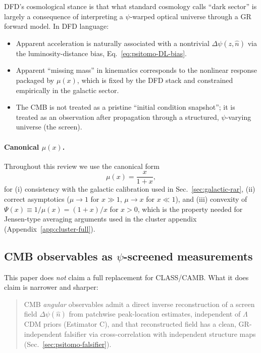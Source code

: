 DFD's cosmological stance is that what standard cosmology calls ``dark sector'' is largely a consequence of interpreting a $\psi$-warped optical universe through a GR forward model. In DFD language:
\begin{itemize}
\item Apparent acceleration is naturally associated with a nontrivial $\Delta\psi(z,\hat n)$ via the luminosity-distance bias, Eq.~\eqref{eq:psitomo-DL-bias}.
\item Apparent ``missing mass'' in kinematics corresponds to the nonlinear response packaged by $\mu(x)$, which is fixed by the DFD stack and constrained empirically in the galactic sector.
\item The CMB is not treated as a pristine ``initial condition snapshot''; it is treated as an observation after propagation through a structured, $\psi$-varying universe (the screen).
\end{itemize}

\paragraph{Canonical $\mu(x)$.}
Throughout this review we use the canonical form
\begin{equation}
\mu(x)=\frac{x}{1+x},
\end{equation}
for (i) consistency with the galactic calibration used in Sec.~\ref{sec:galactic-rar}, (ii) correct asymptotics ($\mu\to 1$ for $x\gg 1$, $\mu\to x$ for $x\ll 1$), and (iii) convexity of $\Psi(x)\equiv 1/\mu(x)=(1+x)/x$ for $x>0$, which is the property needed for Jensen-type averaging arguments used in the cluster appendix (Appendix~\ref{app:cluster-full}).

\subsection{CMB observables as $\psi$-screened measurements}\label{sec:psi-cmb}

This paper does \emph{not} claim a full replacement for CLASS/CAMB. What it does claim is narrower and sharper:

\begin{quote}
CMB \emph{angular} observables admit a direct inverse reconstruction of a screen field $\Delta\psi(\hat n)$ from patchwise peak-location estimates, independent of $\Lambda$CDM priors (Estimator C), and that reconstructed field has a clean, GR-independent falsifier via cross-correlation with independent structure maps (Sec.~\ref{sec:psitomo-falsifier}).
\end{quote}


